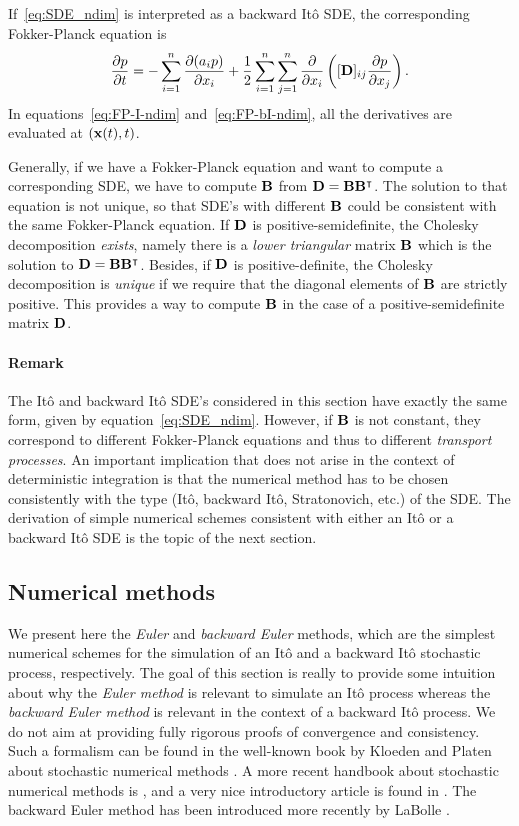 If~\eqref{eq:SDE_ndim} is interpreted as a backward Itô SDE, the corresponding Fokker-Planck equation is
\begin{equation} \label{eq:FP-bI-ndim}
	\frac{\partial p}{\partial t} = -\sum_{i=1}^n \frac{\partial(a_ip)}{\partial x_i} + \frac{1}{2} \sum_{i=1}^n \sum_{j=1}^n \frac{\partial}{\partial x_i}\left( [\mathbf D]_{ij} \frac{\partial p}{\partial x_j} \right).
\end{equation}
In equations~\eqref{eq:FP-I-ndim} and~\eqref{eq:FP-bI-ndim}, all the derivatives are evaluated at $(\mathbf x(t),t)$.

Generally, if we have a Fokker-Planck equation and want to compute a corresponding SDE, we have to compute $\mathbf B$ from $\mathbf D = \mathbf B \mathbf B^{\intercal}$. The solution to that equation is not unique, so that SDE's with different $\mathbf B$ could be consistent with the same Fokker-Planck equation. If $\mathbf D$ is positive-semidefinite, the Cholesky decomposition \textit{exists}, namely there is a \textit{lower triangular} matrix $\mathbf B$ which is the solution to $\mathbf D = \mathbf B \mathbf B^{\intercal}$. Besides, if $\mathbf D$ is positive-definite, the Cholesky decomposition is \textit{unique} if we require that the diagonal elements of $\mathbf B$ are strictly positive. This provides a way to compute $\mathbf B$ in the case of a positive-semidefinite matrix $\mathbf D$.

\paragraph{Remark} The Itô and backward Itô SDE's considered in this section have exactly the same form, given by equation~\eqref{eq:SDE_ndim}. However, if $\mathbf B$ is not constant, they correspond to different Fokker-Planck equations and thus to different \textit{transport processes}. An important implication that does not arise in the context of deterministic integration is that the numerical method has to be chosen consistently with the type (Itô, backward Itô, Stratonovich, etc.) of the SDE. The derivation of simple numerical schemes consistent with either an Itô or a backward Itô SDE is the topic of the next section.

\subsection{Numerical methods} \label{sec:numericalmethods}
We present here the \textit{Euler} and \textit{backward Euler} methods, which are the simplest numerical schemes for the simulation of an Itô and a backward Itô stochastic process, respectively. The goal of this section is really to provide some intuition about why the \textit{Euler method} is relevant to simulate an Itô process whereas the \textit{backward Euler method} is relevant in the context of a backward Itô process. We do not aim at providing fully rigorous proofs of convergence and consistency. Such a formalism can be found in the well-known book by Kloeden and Platen about stochastic numerical methods \cite{kloedenplaten1995numerical}. A more recent handbook about stochastic numerical methods is \cite{colet2014stochastic}, and a very nice introductory article is found in \cite{higham2001algorithmic}. The backward Euler method has been introduced more recently by LaBolle \cite{labolle2000diffusion}.

